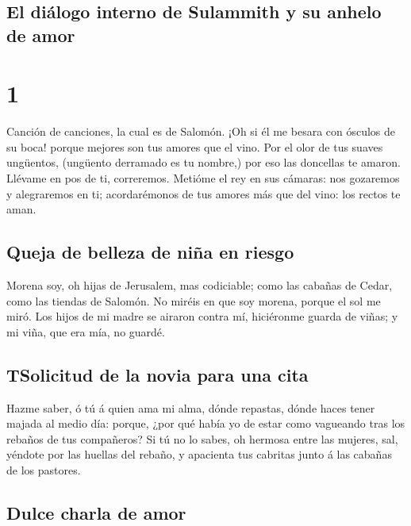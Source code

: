 \hypertarget{el-diuxe1logo-interno-de-sulammith-y-su-anhelo-de-amor}{%
\subsection{El diálogo interno de Sulammith y su anhelo de
amor}\label{el-diuxe1logo-interno-de-sulammith-y-su-anhelo-de-amor}}

\hypertarget{section}{%
\section{1}\label{section}}

 Canción de canciones, la cual es de Salomón. 
¡Oh si él me besara con ósculos de su boca! porque mejores son tus
amores que el vino.  Por el olor de tus suaves ungüentos,
(ungüento derramado es tu nombre,) por eso las doncellas te amaron.
 Llévame en pos de ti, correremos. Metióme el rey en sus
cámaras: nos gozaremos y alegraremos en ti; acordarémonos de tus amores
más que del vino: los rectos te aman.

\hypertarget{queja-de-belleza-de-niuxf1a-en-riesgo}{%
\subsection{Queja de belleza de niña en
riesgo}\label{queja-de-belleza-de-niuxf1a-en-riesgo}}

 Morena soy, oh hijas de Jerusalem, mas codiciable; como las
cabañas de Cedar, como las tiendas de Salomón.  No miréis en
que soy morena, porque el sol me miró. Los hijos de mi madre se airaron
contra mí, hiciéronme guarda de viñas; y mi viña, que era mía, no
guardé.

\hypertarget{tsolicitud-de-la-novia-para-una-cita}{%
\subsection{TSolicitud de la novia para una
cita}\label{tsolicitud-de-la-novia-para-una-cita}}

 Hazme saber, ó tú á quien ama mi alma, dónde repastas,
dónde haces tener majada al medio día: porque, ¿por qué había yo de
estar como vagueando tras los rebaños de tus compañeros?  Si
tú no lo sabes, oh hermosa entre las mujeres, sal, yéndote por las
huellas del rebaño, y apacienta tus cabritas junto á las cabañas de los
pastores.

\hypertarget{dulce-charla-de-amor}{%
\subsection{Dulce charla de amor}\label{dulce-charla-de-amor}}

